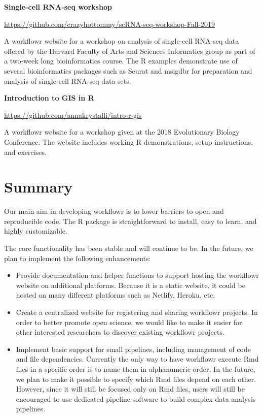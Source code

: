 \documentclass[9pt,a4paper]{extarticle}
\begin{document}
\textbf{Single-cell RNA-seq workshop}

\url{https://github.com/crazyhottommy/scRNA-seq-workshop-Fall-2019}

A workflowr website for a workshop on analysis of single-cell RNA-seq
data offered by the Harvard Faculty of Arts and Sciences Informatics
group as part of a two-week long bioinformatics course. The R examples
demonstrate use of several bioinformatics packages such as Seurat and
msigdbr for preparation and analysis of single-cell RNA-seq data sets.

\textbf{Introduction to GIS in R}

\url{https://github.com/annakrystalli/intro-r-gis}

A workflowr website for a workshop given at the 2018 Evolutionary
Biology Conference. The website includes working R demonstrations, setup
instructions, and exercises.

\section*{Summary}

Our main aim in developing workflowr is to lower barriers to open and
reproducible code. The R package is straightforward to install, easy to
learn, and highly customizable.

The core functionality has been stable and will continue to be. In the
future, we plan to implement the following enhancements:

\begin{itemize}

\item Provide documentation and helper functions to support hosting the
workflowr website on additional platforms. Because it is a static
website, it could be hosted on many different platforms such as Netlify,
Heroku, etc.

\item Create a centralized website for registering and sharing workflowr
projects. In order to better promote open science, we would like to make
it easier for other interested researchers to discover existing
workflowr projects.

\item Implement basic support for small pipelines, including management
of code and file dependencies. Currently the only way to have workflowr
execute Rmd files in a specific order is to name them in alphanumeric
order. In the future, we plan to make it possible to specify which Rmd
files depend on each other. However, since it will still be focused only
on Rmd files, users will still be encouraged to use dedicated pipeline
software to build complex data analysis pipelines.

\end{itemize}
\end{document}

